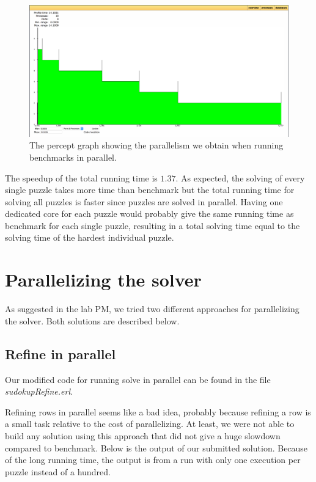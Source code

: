 \documentclass[a4paper]{article}
\begin{document}
\begin{figure}[!htb]
\begin{center}
\includegraphics[scale=0.2]{bencmarks_in_parallel}
\caption{The percept graph showing the parallelism we obtain when running benchmarks in parallel.}
\label{fig:benchpar}
\end{center}
\end{figure}
  
The speedup of the total running time is $1.37$. As expected, the solving of every single puzzle takes more time than benchmark but the total running time for solving all puzzles is faster since puzzles are solved in parallel. Having one dedicated core for each puzzle would probably give the same running time as benchmark for each single puzzle, resulting in a total solving time equal to the solving time of the hardest individual puzzle.

\newpage
\section{Parallelizing the solver}
As suggested in the lab PM, we tried two different approaches for parallelizing the solver. Both solutions are described below.

\subsection{Refine in parallel}
Our modified code for running solve in parallel can be found in the file \textit{sudoku\textunderscore pRefine.erl}.

Refining rows in parallel seems like a bad idea, probably because refining a row is a small task relative to the cost of parallelizing. At least, we were not able to build any solution using this approach that did not give a huge slowdown compared to benchmark. Below is the output of our submitted solution. Because of the long running time, the output is from a run with only one execution per puzzle instead of a hundred.
\end{document}
